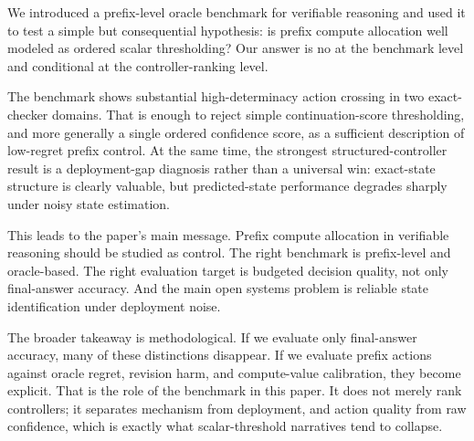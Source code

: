We introduced a prefix-level oracle benchmark for verifiable reasoning and used it to test a simple but consequential hypothesis:
is prefix compute allocation well modeled as ordered scalar thresholding?
Our answer is no at the benchmark level and conditional at the controller-ranking level.

The benchmark shows substantial high-determinacy action crossing in two exact-checker domains.
That is enough to reject simple continuation-score thresholding, and more generally a single ordered confidence score, as a sufficient description of low-regret prefix control.
At the same time, the strongest structured-controller result is a deployment-gap diagnosis rather than a universal win:
exact-state structure is clearly valuable, but predicted-state performance degrades sharply under noisy state estimation.

This leads to the paper's main message.
Prefix compute allocation in verifiable reasoning should be studied as \processstate control.
The right benchmark is prefix-level and oracle-based.
The right evaluation target is budgeted decision quality, not only final-answer accuracy.
And the main open systems problem is reliable state identification under deployment noise.

The broader takeaway is methodological.
If we evaluate only final-answer accuracy, many of these distinctions disappear.
If we evaluate prefix actions against oracle regret, revision harm, and compute-value calibration, they become explicit.
That is the role of the benchmark in this paper.
It does not merely rank controllers; it separates mechanism from deployment, and action quality from raw confidence, which is exactly what scalar-threshold narratives tend to collapse.

